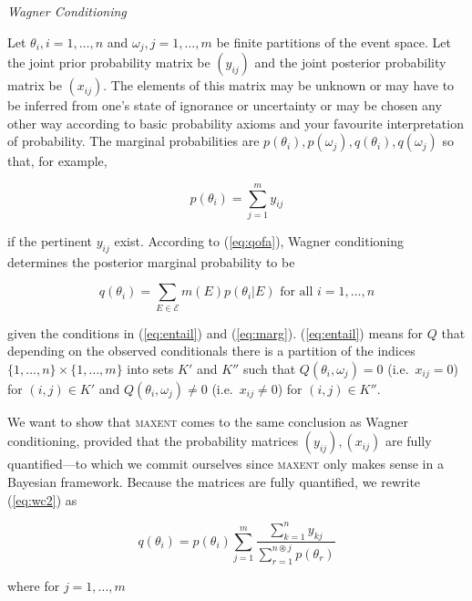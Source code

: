 \documentclass[11pt]{article}
\begin{document}
\medskip

{\noindent}\emph{Wagner Conditioning}

\medskip

{\noindent}Let $\theta_{i},i=1,\ldots,n$ and
$\omega_{j},j=1,\ldots,m$ be finite partitions of the event space. Let
the joint prior probability matrix be $(y_{ij})$ and the joint
posterior probability matrix be $(x_{ij})$. The elements of this
matrix may be unknown or may have to be inferred from one's state of
ignorance or uncertainty or may be chosen any other way according to
basic probability axioms and your favourite interpretation of
probability. The marginal probabilities are
$p(\theta_{i}),p(\omega_{j}),q(\theta_{i}),q(\omega_{j})$ so that, for
example,

\begin{equation}
  \label{eq:wc1}
  p(\theta_{i})=\sum_{j=1}^{m}y_{ij}
\end{equation}

if the pertinent $y_{ij}$ exist. According to (\ref{eq:qofa}), Wagner
conditioning determines the posterior marginal probability to be

\begin{equation}
  \label{eq:wc2}
    q(\theta_{i})=\sum_{E\in\mathcal{E}}m(E)p(\theta_{i}|E)\mbox{ for
      all }i=1,\ldots,n
\end{equation}

given the conditions in (\ref{eq:entail}) and (\ref{eq:marg}).
(\ref{eq:entail}) means for $Q$ that depending on the observed
conditionals there is a partition of the indices
$\{1,\ldots,n\}\times\{1,\ldots,m\}$ into sets $K'$ and $K''$ such
that $Q(\theta_{i},\omega_{j})=0$ (i.e.\ $x_{ij}=0$) for
$(i,j)\in{}K'$ and $Q(\theta_{i},\omega_{j})\neq{}0$ (i.e.\
$x_{ij}\neq{}0$) for $(i,j)\in{}K''$.

We want to show that \textsc{maxent} comes to the same conclusion as
Wagner conditioning, provided that the probability matrices
$(y_{ij}),(x_{ij})$ are fully quantified---to which we commit
ourselves since \textsc{maxent} only makes sense in a Bayesian
framework. Because the matrices are fully quantified, we rewrite
(\ref{eq:wc2}) as

\begin{equation}
  \label{eq:wc3}
  q(\theta_{i})=p(\theta_{i})\sum_{j=1}^{m}\frac{\sum_{k=1}^{n}y_{kj}}{\sum_{r=1}^{n\circledast{}j}p(\theta_{r})}
\end{equation}

where for $j=1,\ldots,m$
\end{document}
